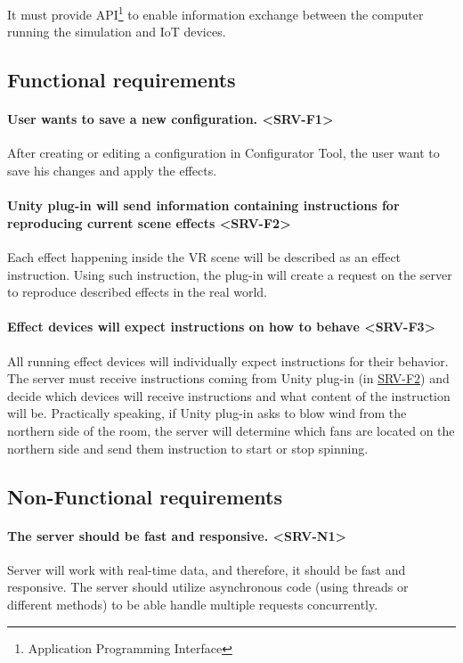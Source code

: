 It must provide API\footnote{Application Programming Interface} to enable
information exchange between the computer running the simulation and IoT devices.


\subsection{Functional requirements}

\paragraph*{User wants to save a new configuration. <SRV-F1>}
\label{srv-f1}
After creating or editing a configuration in Configurator Tool, the user
want to save his changes and apply the effects.


\paragraph*{Unity plug-in will send information containing instructions for reproducing current scene effects <SRV-F2>}
\label{srv-f2}
Each effect happening inside the VR scene will be described as an effect
instruction. Using such instruction, the plug-in will create a request on the server to
reproduce described effects in the real world.


\paragraph*{Effect devices will expect instructions on how to behave <SRV-F3>}
\label{srv-f3}
All running effect devices will individually expect instructions for their
behavior. The server must receive instructions coming from Unity plug-in (in \hyperref[srv-f2]{SRV-F2})
and decide which devices will receive instructions and what content of the
instruction will be.
Practically speaking, if Unity plug-in asks to blow wind from the northern side of
the room, the server will determine which fans are located on the northern side
and send them instruction to start or stop spinning.

\pagebreak

\subsection{Non-Functional requirements}

\paragraph*{The server should be fast and responsive. <SRV-N1>}
\label{srv-n1}
Server will work with real-time data, and therefore, it should be fast and
responsive. The server should utilize asynchronous code (using threads or 
different methods) to be able handle multiple requests concurrently.

